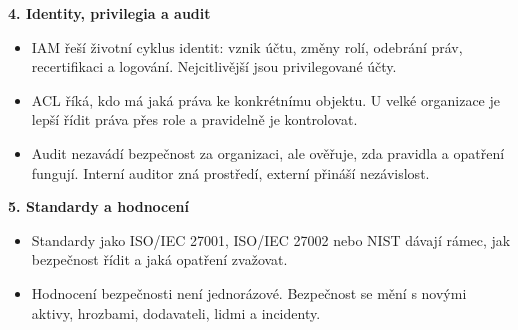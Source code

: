 \textbf{4. Identity, privilegia a audit}
\begin{itemize}
  \item IAM řeší životní cyklus identit: vznik účtu, změny rolí, odebrání práv, recertifikaci a logování. Nejcitlivější jsou privilegované účty.
  \item ACL říká, kdo má jaká práva ke konkrétnímu objektu. U velké organizace je lepší řídit práva přes role a pravidelně je kontrolovat.
  \item Audit nezavádí bezpečnost za organizaci, ale ověřuje, zda pravidla a opatření fungují. Interní auditor zná prostředí, externí přináší nezávislost.
\end{itemize}

\textbf{5. Standardy a hodnocení}
\begin{itemize}
  \item Standardy jako ISO/IEC 27001, ISO/IEC 27002 nebo NIST dávají rámec, jak bezpečnost řídit a jaká opatření zvažovat.
  \item Hodnocení bezpečnosti není jednorázové. Bezpečnost se mění s novými aktivy, hrozbami, dodavateli, lidmi a incidenty.
\end{itemize}


